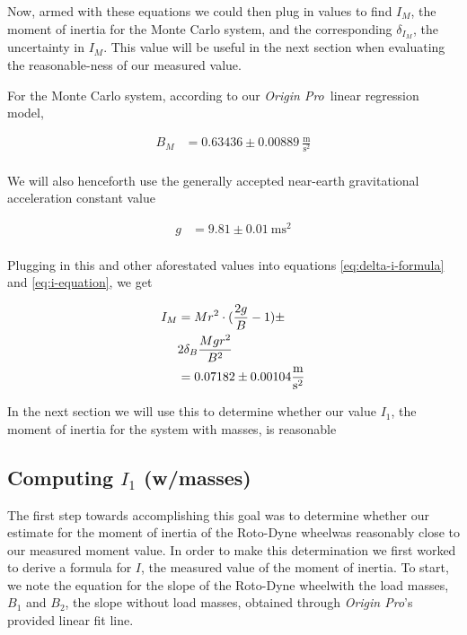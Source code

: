 \documentclass[coverpage]{article}
\newcommand{\softwareText}[1]{\textit{#1}\texttrademark}
\newcommand{\origin}{\softwareText{Origin Pro}}
\newcommand{\rwheel}{Roto-Dyne wheel}
\newcommand{\mpssq}{\frac{\text{m}}{\text{s}^2}}
\begin{document}
	Now, armed with these equations we could then plug in values to find $I_M$, the moment of inertia for the Monte Carlo system, and the corresponding $\delta_{I_M}$, the uncertainty in $I_M$. This value will be useful in the next section when evaluating the reasonable-ness of our measured value.
	
	For the Monte Carlo system, according to our \origin~linear regression model,
	
	\begin{align}
		B_M &= 0.63436 \pm 0.00889\ \mpssq \\
	\end{align}
	
	We will also henceforth use the generally accepted near-earth gravitational acceleration constant value
	
	\begin{align}
		g &= 9.81 \pm 0.01\ \text{m} \text{s}^2 \label{eq:def-g} \\
	\end{align}
	
	Plugging in this and other aforestated values into equations \ref{eq:delta-i-formula} and \ref{eq:i-equation}, we get
	
	\begin{align}
		I_M &= Mr^2 \cdot (\frac{2g}{B} - 1) \pm \notag \\
		&2 \delta_B \frac{M g r^2}{B^2} \notag \\
		&= 0.07182 \pm 0.00104 \mpssq
	\end{align}

	In the next section we will use this to determine whether our value $I_1$, the moment of inertia for the system with masses, is reasonable
	
	\subsection{Computing $I_1$ (w/masses)}
	
	The first step towards accomplishing this goal was to determine whether our estimate for the moment of inertia of the \rwheel was reasonably close to our measured moment value. In order to make this determination we first worked to derive a formula for $I$, the measured value of the moment of inertia. To start, we note the equation for the slope of the \rwheel with the load masses, $B_1$ and $B_2$, the slope without load masses, obtained through \origin's provided linear fit line.

	\newcommand{\massSlopeUncert}{\delta_B}
\end{document}
